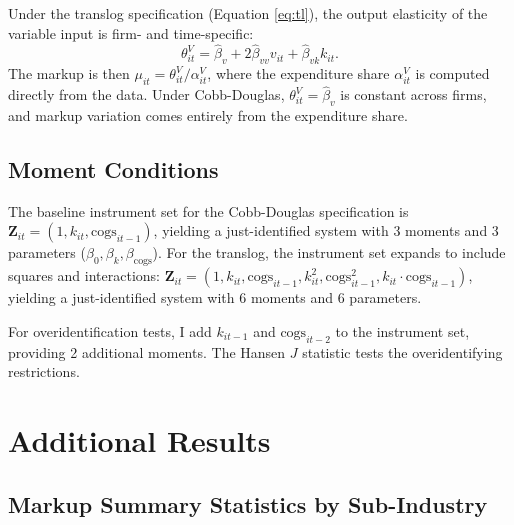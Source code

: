 \documentclass[11pt]{article}
\begin{document}
Under the translog specification (Equation \ref{eq:tl}), the output elasticity of the variable input is firm- and time-specific:
\begin{equation}
    \theta^V_{it} = \hat{\beta}_v + 2\hat{\beta}_{vv} v_{it} + \hat{\beta}_{vk} k_{it}.
\end{equation}
The markup is then $\mu_{it} = \theta^V_{it} / \alpha^V_{it}$, where the expenditure share $\alpha^V_{it}$ is computed directly from the data. Under Cobb-Douglas, $\theta^V_{it} = \hat{\beta}_v$ is constant across firms, and markup variation comes entirely from the expenditure share.

\subsection{Moment Conditions}\label{app:moments}

The baseline instrument set for the Cobb-Douglas specification is $\mathbf{Z}_{it} = (1, k_{it}, \text{cogs}_{it-1})$, yielding a just-identified system with 3 moments and 3 parameters ($\beta_0, \beta_k, \beta_{\text{cogs}}$). For the translog, the instrument set expands to include squares and interactions: $\mathbf{Z}_{it} = (1, k_{it}, \text{cogs}_{it-1}, k_{it}^2, \text{cogs}_{it-1}^2, k_{it} \cdot \text{cogs}_{it-1})$, yielding a just-identified system with 6 moments and 6 parameters.

For overidentification tests, I add $k_{it-1}$ and $\text{cogs}_{it-2}$ to the instrument set, providing 2 additional moments. The Hansen $J$ statistic tests the overidentifying restrictions.

\section{Additional Results}\label{app:additional}

\subsection{Markup Summary Statistics by Sub-Industry}\label{app:markup_nace}
\end{document}
